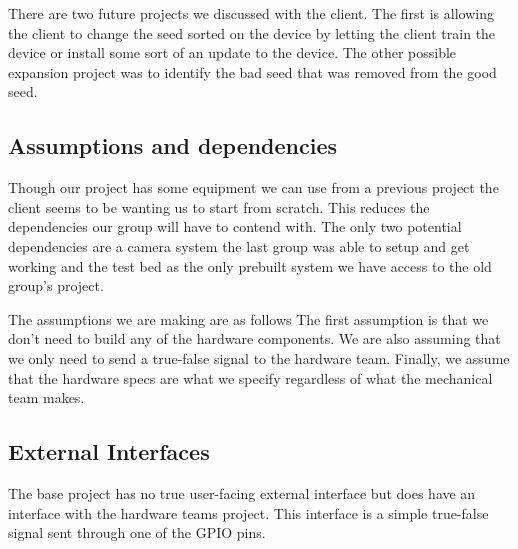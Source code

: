 \documentclass[onecolumn, draftclsnofoot,10pt, compsoc]{IEEEtran}
\begin{document}
There are two future projects we discussed with the client.
The first is allowing the client to change the seed sorted on the device by letting the client train the device or install some sort of an update to the device.
The other possible expansion project was to identify the bad seed that was removed from the good seed.

\subsection{Assumptions and dependencies}
Though our project has some equipment we can use from a previous project the client seems to be wanting us to start from scratch.
This reduces the dependencies our group will have to contend with.
The only two potential dependencies are a camera system the last group was able to setup and get working and the test bed as the only prebuilt system we have access to the old group's project.

The assumptions we are making are as follows
The first assumption is that we don’t need to build any of the hardware components.
We are also assuming that we only need to send a true-false signal to the hardware team.
Finally, we assume that the hardware specs are what we specify regardless of what the mechanical team makes.

\subsection{External Interfaces}
The base project has no true user-facing external interface but does have an interface with the hardware teams project.
This interface is a simple true-false signal sent through one of the GPIO pins.
\end{document}
